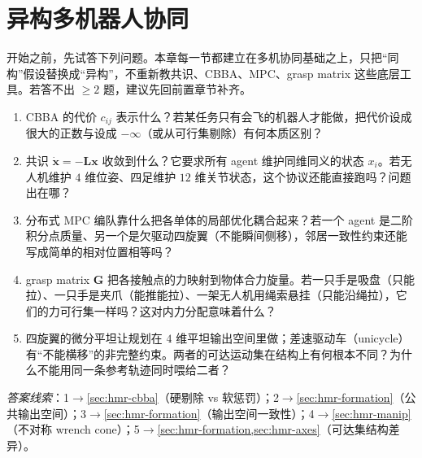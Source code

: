 \chapter{异构多机器人协同}
\label{ch:mr-hetero}



\begin{practice}[前置自测]
开始之前，先试答下列问题。本章每一节都建立在多机协同基础之上，只把“同构”假设替换成“异构”，不重新教共识、CBBA、MPC、grasp matrix 这些底层工具。若答不出 $\ge 2$ 题，建议先回前置章节补齐。
\begin{enumerate}
  \item CBBA 的代价 $c_{ij}$ 表示什么？若某任务只有会飞的机器人才能做，把代价设成很大的正数与设成 $-\infty$（或从可行集剔除）有何本质区别？
  \item 共识 $\dot{\mathbf{x}}=-\mathbf{L}\mathbf{x}$ 收敛到什么？它要求所有 agent 维护同维同义的状态 $x_i$。若无人机维护 $4$ 维位姿、四足维护 $12$ 维关节状态，这个协议还能直接跑吗？问题出在哪？
  \item 分布式 MPC 编队靠什么把各单体的局部优化耦合起来？若一个 agent 是二阶积分点质量、另一个是欠驱动四旋翼（不能瞬间侧移），邻居一致性约束还能写成简单的相对位置相等吗？
  \item grasp matrix $\mathbf{G}$ 把各接触点的力映射到物体合力旋量。若一只手是吸盘（只能拉）、一只手是夹爪（能推能拉）、一架无人机用绳索悬挂（只能沿绳拉），它们的力可行集一样吗？这对内力分配意味着什么？
  \item 四旋翼的微分平坦让规划在 $4$ 维平坦输出空间里做；差速驱动车（unicycle）有“不能横移”的非完整约束。两者的可达运动集在结构上有何根本不同？为什么不能用同一条参考轨迹同时喂给二者？
\end{enumerate}
\noindent\emph{答案线索}：1$\to$\cref{sec:hmr-cbba}（硬剔除 vs 软惩罚）；2$\to$\cref{sec:hmr-formation}（公共输出空间）；3$\to$\cref{sec:hmr-formation}（输出空间一致性）；4$\to$\cref{sec:hmr-manip}（不对称 wrench cone）；5$\to$\cref{sec:hmr-formation,sec:hmr-axes}（可达集结构差异）。
\end{practice}

